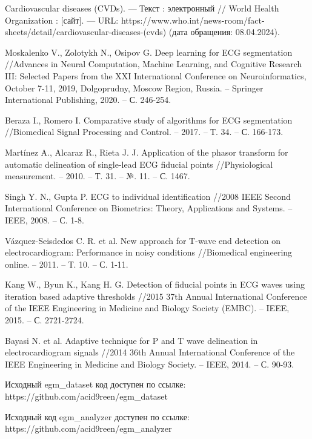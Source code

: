 \begingroup
\begin{thebibliography}{00}
	Cardiovascular diseases (CVDs). --- Текст : электронный // World Health
	Organization : [сайт]. --- URL:
	https://www.who.int/news-room/fact-sheets/detail/cardiovascular-diseases-(cvds)
	(дата обращения: 08.04.2024).

	Moskalenko V., Zolotykh N., Osipov G. Deep learning for ECG segmentation
	//Advances in Neural Computation, Machine Learning, and Cognitive Research
	III: Selected Papers from the XXI International Conference on
	Neuroinformatics, October 7-11, 2019, Dolgoprudny, Moscow Region, Russia. –
	Springer International Publishing, 2020. – С. 246-254.

	Beraza I., Romero I. Comparative study of algorithms for ECG segmentation
	//Biomedical Signal Processing and Control. – 2017. – Т. 34. – С. 166-173.

	Martínez A., Alcaraz R., Rieta J. J. Application of the phasor transform
	for automatic delineation of single-lead ECG fiducial points
	//Physiological measurement. – 2010. – Т. 31. – №. 11. – С. 1467.

	Singh Y. N., Gupta P. ECG to individual identification //2008 IEEE Second
	International Conference on Biometrics: Theory, Applications and Systems. –
	IEEE, 2008. – С. 1-8.

	Vázquez-Seisdedos C. R. et al. New approach for T-wave end detection on
	electrocardiogram: Performance in noisy conditions //Biomedical engineering
	online. – 2011. – Т. 10. – С. 1-11.

	Kang W., Byun K., Kang H. G. Detection of fiducial points in ECG waves
	using iteration based adaptive thresholds //2015 37th Annual International
	Conference of the IEEE Engineering in Medicine and Biology Society (EMBC).
	– IEEE, 2015. – С. 2721-2724.

	Bayasi N. et al. Adaptive technique for P and T wave delineation in
	electrocardiogram signals //2014 36th Annual International Conference of
	the IEEE Engineering in Medicine and Biology Society. – IEEE, 2014. – С.
	90-93.

	Исходный egm\_dataset код доступен по ссылке: https://github.com/acid9reen/egm\_dataset

	Исходный код egm\_analyzer доступен по ссылке: https://github.com/acid9reen/egm\_analyzer


\end{thebibliography}
